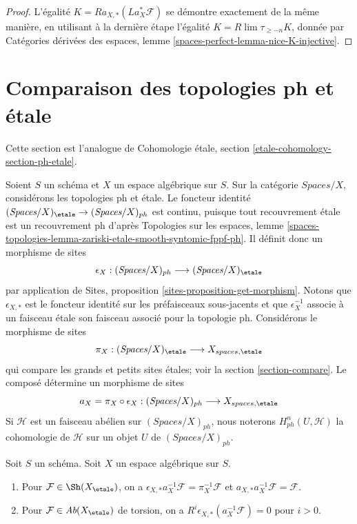 \begin{proof}
\medskip\noindent
L'égalité $K = Ra_{X, *}(La_X^*\mathcal{F})$ se démontre exactement de la même
manière, en utilisant à la dernière étape l'égalité
$K = R\lim \tau_{\geq -n}K$, donnée par Catégories dérivées des espaces,
lemme \ref{spaces-perfect-lemma-nice-K-injective}.
\end{proof}








\section{Comparaison des topologies ph et étale}
\label{section-ph-etale}

\noindent
Cette section est l'analogue de Cohomologie étale, section
\ref{etale-cohomology-section-ph-etale}.

\medskip\noindent
Soient $S$ un schéma et $X$ un espace algébrique sur $S$.
Sur la catégorie $\textit{Spaces}/X$, considérons les topologies ph et étale.
Le foncteur identité
$(\textit{Spaces}/X)_\etale \to (\textit{Spaces}/X)_{ph}$
est continu, puisque tout recouvrement étale est un recouvrement ph d'après
Topologies sur les espaces, lemme
\ref{spaces-topologies-lemma-zariski-etale-smooth-syntomic-fppf-ph}.
Il définit donc un morphisme de sites
$$
\epsilon_X :
(\textit{Spaces}/X)_{ph} \longrightarrow (\textit{Spaces}/X)_\etale
$$
par application de Sites, proposition \ref{sites-proposition-get-morphism}.
Notons que $\epsilon_{X, *}$ est le foncteur identité sur les préfaisceaux
sous-jacents et que $\epsilon_X^{-1}$ associe à un faisceau étale son faisceau
associé pour la topologie ph.
Considérons le morphisme de sites
$$
\pi_X : (\textit{Spaces}/X)_\etale \longrightarrow X_{spaces, \etale}
$$
qui compare les grands et petits sites étales; voir la section \ref{section-compare}.
Le composé détermine un morphisme de sites
$$
a_X = \pi_X \circ \epsilon_X :
(\textit{Spaces}/X)_{ph}
\longrightarrow
X_{spaces, \etale}
$$
Si $\mathcal{H}$ est un faisceau abélien sur $(\textit{Spaces}/X)_{ph}$,
nous noterons $H^n_{ph}(U, \mathcal{H})$ la cohomologie de
$\mathcal{H}$ sur un objet $U$ de $(\textit{Spaces}/X)_{ph}$.

\begin{lemma}
\label{lemma-comparison-ph-etale}
Soit $S$ un schéma. Soit $X$ un espace algébrique sur $S$.
\begin{enumerate}
\item Pour $\mathcal{F} \in \Sh(X_\etale)$, on a
$\epsilon_{X, *}a_X^{-1}\mathcal{F} = \pi_X^{-1}\mathcal{F}$
et $a_{X, *}a_X^{-1}\mathcal{F} = \mathcal{F}$.
\item Pour $\mathcal{F} \in \textit{Ab}(X_\etale)$ de torsion, on a
$R^i\epsilon_{X, *}(a_X^{-1}\mathcal{F}) = 0$ pour $i > 0$.
\end{enumerate}
\end{lemma}

